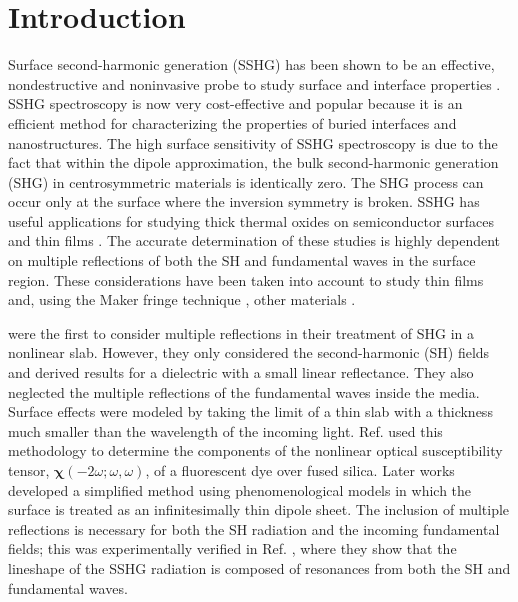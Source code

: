 \documentclass[utf8]{frontiersSCNS}
\begin{document}
\section{Introduction}\label{sec:intro}

Surface second-harmonic generation (SSHG) has been shown to be an effective,
nondestructive and noninvasive probe to study surface and interface properties
\citep{chenPRL81, shenNAT89, mcgilpOE94, bloembergenAPB99, mcgilpSRL99,
lupkeSSR99, downerPSSA01, downerSIA01}. SSHG spectroscopy is now very
cost-effective and popular because it is an efficient method for characterizing
the properties of buried interfaces and nanostructures. The high surface
sensitivity of SSHG spectroscopy is due to the fact that within the dipole
approximation, the bulk second-harmonic generation (SHG) in centrosymmetric
materials is identically zero. The SHG process can occur only at the surface
where the inversion symmetry is broken. SSHG has useful applications for
studying thick thermal oxides on semiconductor surfaces
\citep{vanhasseltJOSAB95, kolthammerPRB05} and thin films \citep{yeganehPRB92}.
The accurate determination of these studies is highly dependent on multiple
reflections of both the SH and fundamental waves in the surface region. These
considerations have been taken into account to study thin films
\citep{haseAPL92, buinitskayaMJPS02, buinitskayaCAS03} and, using the Maker
fringe technique \citep{makerPRL62}, other materials \citep{tellierOC07,
abeJOSAB08}.

\cite{bloembergenPR62} were the first to consider multiple reflections in their
treatment of SHG in a nonlinear slab. However, they only considered the
second-harmonic (SH) fields and derived results for a dielectric with a small
linear reflectance. They also neglected the multiple reflections of the
fundamental waves inside the media. Surface effects were modeled by taking the
limit of a thin slab with a thickness much smaller than the wavelength of the
incoming light. Ref. \citep{dickAPB85} used this methodology to determine the
components of the nonlinear optical susceptibility tensor,
$\boldsymbol{\chi}(-2\omega;\omega,\omega)$, of a fluorescent dye over fused
silica. Later works \citep{sipePRB87, mizrahiJOSA88} developed a simplified
method using phenomenological models in which the surface is treated as an
infinitesimally thin dipole sheet. The inclusion of multiple reflections is
necessary for both the SH radiation and the incoming fundamental fields; this
was experimentally verified in Ref. \citep{moritaJJAP88}, where they show that
the lineshape of the SSHG radiation is composed of resonances from both the SH
and fundamental waves.
\end{document}
